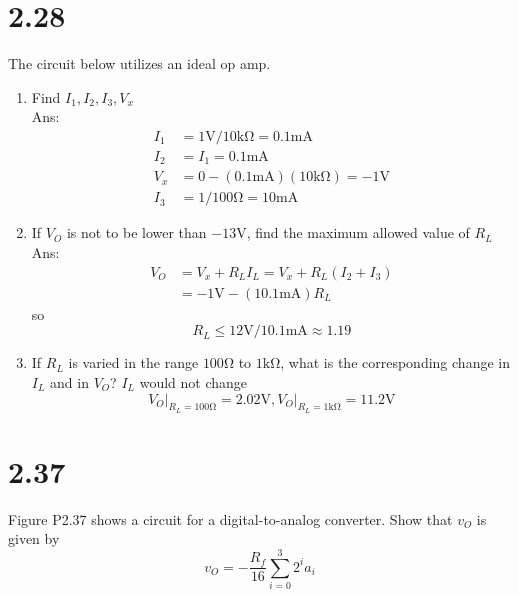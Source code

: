 \documentclass[12pt, a4paper]{article}
\newcommand{\smia}{\si{\milli\ampere}}
\newcommand{\svol}{\si{\volt}}
\newcommand{\sohm}{\si{\ohm}}
\newcommand{\skom}{\si{\kilo\ohm}}
\begin{document}
\section{2.28}
The circuit below utilizes an ideal op amp.\\
\begin{enumerate}[label=(\alph*)]
  \item Find $I_1, I_2, I_3, V_x$\\
    Ans: 
    \begin{align*}
      I_1 &= 1\si{\volt} / 10\si{\kilo\ohm} = 0.1\si{\milli\ampere}\\
      I_2 &= I_1 = 0.1\si{\milli\ampere}\\
      V_x &= 0 - (0.1\si{\milli\ampere})(10\si{\kilo\ohm}) = -1 \si{\volt}\\
      I_3 &= 1 / 100\si{\ohm} = 10\si{\milli\ampere}
    \end{align*}
  \item If $V_O$ is not to be lower than $-13\si{\volt}$, find the maximum allowed value of $R_L$\\
    Ans: 
    \begin{align*}
      V_O &= V_x + R_L I_L = V_x + R_L (I_2 + I_3)\\
          &= - 1\si{\volt} - (10.1 \smia) R_L
    \end{align*}
    so
    \[
      R_L \leq 12\svol / 10.1 \smia \approx 1.19
    \]
  \item If $R_L$ is varied in the range $100 \sohm$ to $1 \si{\kilo\ohm}$, what is the corresponding change in $I_L$ and in $V_O$?
    $I_L$ would not change\\
    \[
      V_O \rvert_{R_L = 100 \sohm} = 2.02 \svol, V_O \rvert_{R_L = 1\skom} = 11.2\svol
    \]
\end{enumerate}


\section{2.37}
Figure P2.37 shows a circuit for a digital-to-analog converter.
Show that $v_O$ is given by
\[
  v_O = - \frac{R_f}{16} \sum_{i=0}^{3} 2^i a_i
\]
\end{document}
